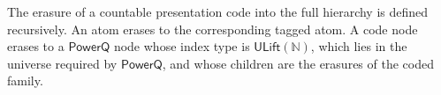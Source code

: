 \begin{definition}
The erasure of a countable presentation code into the full hierarchy is
defined recursively.  An atom erases to the corresponding tagged atom.  A
code node erases to a $\mathsf{PowerQ}$ node whose index type is
$\mathsf{ULift}(\mathbb N)$, which lies in the universe required by
$\mathsf{PowerQ}$, and whose children are the erasures of the coded family.
\end{definition}

